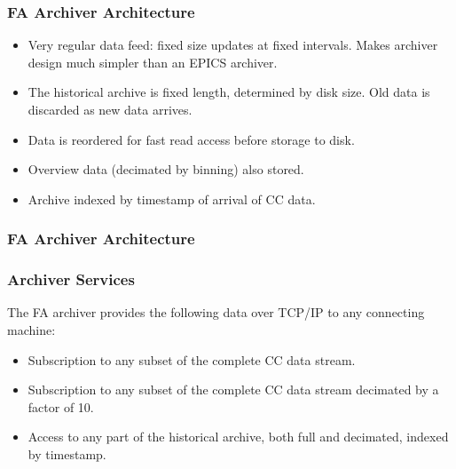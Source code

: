 \documentclass{beamer}
\begin{document}
\begin{frame}\frametitle{FA Archiver Architecture}

\begin{itemize}

\item Very regular data feed: fixed size updates at fixed intervals.
Makes archiver design much simpler than an EPICS archiver.

\item The historical archive is fixed length, determined by disk size.  Old data
is discarded as new data arrives.

\item Data is reordered for fast read access before storage to disk.

\item Overview data (decimated by binning) also stored.

\item Archive indexed by timestamp of arrival of CC data.

\end{itemize}
\end{frame}



\begin{frame}
\frametitle{FA Archiver Architecture}

\end{frame}



\begin{frame}\frametitle{Archiver Services}

The FA archiver provides the following data over TCP/IP to any connecting
machine:

\begin{itemize}

\item Subscription to any subset of the complete CC data stream.

\item Subscription to any subset of the complete CC data stream decimated by a
factor of 10.

\item Access to any part of the historical archive, both full and decimated,
indexed by timestamp.

\end{itemize}
\end{frame}
\end{document}
